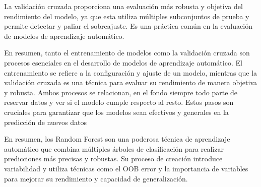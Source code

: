 La validación cruzada proporciona una evaluación más robusta y objetiva del rendimiento del modelo, ya que esta utiliza múltiples subconjuntos de prueba y permite detectar y paliar el sobreajuste. Es una práctica común en la evaluación de modelos de aprendizaje automático.

En resumen, tanto el entrenamiento de modelos como la validación cruzada son procesos esenciales en el desarrollo de modelos de aprendizaje automático. El entrenamiento se refiere a la configuración y ajuste de un modelo, mientras que la validación cruzada es una técnica para evaluar su rendimiento de manera objetiva y robusta. Ambos procesos se relacionan, en el fondo siempre todo parte de reservar datos y ver si el modelo cumple respecto al resto. Estos pasos son cruciales para garantizar que los modelos sean efectivos y generales en la predicción de nuevos datos


\vspace{10pt}

En resumen, los Random Forest son una poderosa técnica de aprendizaje automático que combina múltiples árboles de clasificación para realizar predicciones más precisas y robustas. Su proceso de creación introduce variabilidad y utiliza técnicas como el OOB error y la importancia de variables para mejorar su rendimiento y capacidad de generalización.

